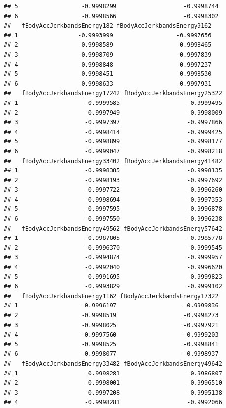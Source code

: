 \documentclass[
]{article}
\begin{document}
\begin{verbatim}
## 5                  -0.9998299                   -0.9998744
## 6                  -0.9998566                   -0.9998302
##   fBodyAccJerkbandsEnergy182 fBodyAccJerkbandsEnergy9162
## 1                 -0.9993999                  -0.9997656
## 2                 -0.9998589                  -0.9998465
## 3                 -0.9998709                  -0.9997839
## 4                 -0.9998848                  -0.9997237
## 5                 -0.9998451                  -0.9998530
## 6                 -0.9998633                  -0.9997931
##   fBodyAccJerkbandsEnergy17242 fBodyAccJerkbandsEnergy25322
## 1                   -0.9999585                   -0.9999495
## 2                   -0.9997949                   -0.9998009
## 3                   -0.9997397                   -0.9997866
## 4                   -0.9998414                   -0.9999425
## 5                   -0.9998899                   -0.9998177
## 6                   -0.9999047                   -0.9998218
##   fBodyAccJerkbandsEnergy33402 fBodyAccJerkbandsEnergy41482
## 1                   -0.9998385                   -0.9998135
## 2                   -0.9998193                   -0.9997692
## 3                   -0.9997722                   -0.9996260
## 4                   -0.9998694                   -0.9997353
## 5                   -0.9997595                   -0.9996878
## 6                   -0.9997550                   -0.9996238
##   fBodyAccJerkbandsEnergy49562 fBodyAccJerkbandsEnergy57642
## 1                   -0.9987805                   -0.9985778
## 2                   -0.9996370                   -0.9999545
## 3                   -0.9994874                   -0.9999957
## 4                   -0.9992040                   -0.9996620
## 5                   -0.9991695                   -0.9999823
## 6                   -0.9993829                   -0.9999102
##   fBodyAccJerkbandsEnergy1162 fBodyAccJerkbandsEnergy17322
## 1                  -0.9996197                   -0.9999836
## 2                  -0.9998519                   -0.9998273
## 3                  -0.9998025                   -0.9997921
## 4                  -0.9997560                   -0.9999203
## 5                  -0.9998525                   -0.9998841
## 6                  -0.9998077                   -0.9998937
##   fBodyAccJerkbandsEnergy33482 fBodyAccJerkbandsEnergy49642
## 1                   -0.9998281                   -0.9986807
## 2                   -0.9998001                   -0.9996510
## 3                   -0.9997208                   -0.9995138
## 4                   -0.9998281                   -0.9992066

\end{verbatim}
\end{document}
